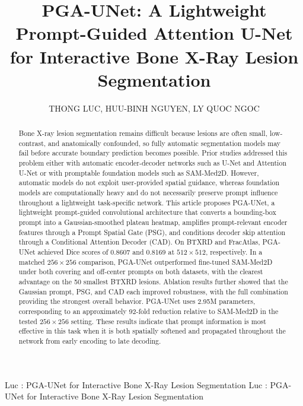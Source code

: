 \documentclass{ieeeaccess}
\begin{document}
\doi{}

\title{PGA-UNet: A Lightweight Prompt-Guided Attention U-Net for Interactive Bone X-Ray Lesion Segmentation}
\author{\uppercase{Thong Luc},
\uppercase{Huu-Binh Nguyen},
\uppercase{Ly Quoc Ngoc}}

\address[1]{B.Sc. Program in Computer Science, Faculty of Information Technology, University of Science, VNU-HCM, Vietnam}
\address[2]{[ Th\`ay \dj i\`en th\^ong tin gi\'up em: affiliation ]}

\markboth
{Luc \headeretal: PGA-UNet for Interactive Bone X-Ray Lesion Segmentation}
{Luc \headeretal: PGA-UNet for Interactive Bone X-Ray Lesion Segmentation}


\begin{abstract}
Bone X-ray lesion segmentation remains difficult because lesions are often small, low-contrast, and anatomically confounded, so fully automatic segmentation models may fail before accurate boundary prediction becomes possible. Prior studies addressed this problem either with automatic encoder-decoder networks such as U-Net and Attention U-Net or with promptable foundation models such as SAM-Med2D. However, automatic models do not exploit user-provided spatial guidance, whereas foundation models are computationally heavy and do not necessarily preserve prompt influence throughout a lightweight task-specific network. This article proposes PGA-UNet, a lightweight prompt-guided convolutional architecture that converts a bounding-box prompt into a Gaussian-smoothed plateau heatmap, amplifies prompt-relevant encoder features through a Prompt Spatial Gate (PSG), and conditions decoder skip attention through a Conditional Attention Decoder (CAD). On BTXRD and FracAtlas, PGA-UNet achieved Dice scores of 0.8607 and 0.8169 at $512\times512$, respectively. In a matched $256\times256$ comparison, PGA-UNet outperformed fine-tuned SAM-Med2D under both covering and off-center prompts on both datasets, with the clearest advantage on the 50 smallest BTXRD lesions. Ablation results further showed that the Gaussian prompt, PSG, and CAD each improved robustness, with the full combination providing the strongest overall behavior. PGA-UNet uses 2.95M parameters, corresponding to an approximately 92-fold reduction relative to SAM-Med2D in the tested $256\times256$ setting. These results indicate that prompt information is most effective in this task when it is both spatially softened and propagated throughout the network from early encoding to late decoding.
\end{abstract}
\end{document}
